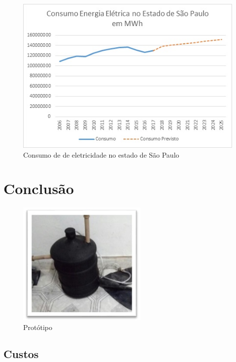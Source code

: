 \documentclass[
	12pt,
	oneside,
	a4paper,
	chapter=TITLE,
	english,
	brazil,
	hidelinks
]{abntex2}
\begin{document}
\begin{figure}[htb]
	\caption{\label{fig_grafico}Consumo de de eletricidade no estado de São Paulo}
	\begin{center}
	    \includegraphics[scale=1.0]{consumo_eletricidade_sp.jpg}
	\end{center}
\end{figure}

\chapter{Conclusão}

\blindtext

\begin{figure}[htb]
	\caption{\label{fig_grafico}Protótipo}
	\begin{center}
	    \includegraphics[scale=1.0]{Prototipo.jpg}
	\end{center}
\end{figure}

\section{Custos}

\Blindtext

\postextual


\end{document}
